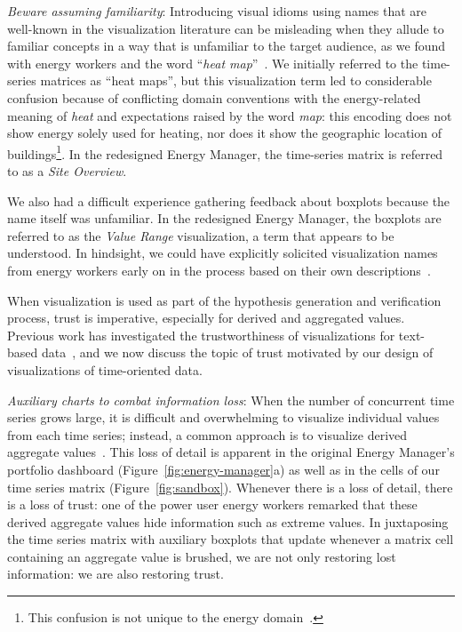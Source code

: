 \documentclass[journal]{vgtc}                %
\newcommand{\bstart}[1]{\vspace{1mm} \noindent{\textbf{#1:}}}
\newcommand{\jn}[1]{\textcolor{darkGreen}{#1}}
\begin{document}


{\it Beware assuming familiarity}: Introducing visual idioms using names that are well-known in the visualization literature can be misleading when they allude to familiar concepts in a way that is unfamiliar to the target audience, as we found with energy workers and the word ``{\it heat map}''~\cite{Field2015,Wilkinson2009}.
We initially referred to the time-series matrices as ``heat maps'', but this visualization term led to considerable confusion because of conflicting domain conventions with the energy-related meaning of {\it heat} and expectations raised by the word {\it map}: this encoding does not show energy solely used for heating, nor does it show the geographic location of buildings\footnote{This confusion is not unique to the energy domain~\cite{Field2015,Wilkinson2009}.}. 
In the redesigned Energy Manager, the time-series matrix is referred to as a {\it Site Overview}.

We also had a difficult experience gathering feedback about boxplots because the name itself was unfamiliar. 
In the redesigned Energy Manager, the boxplots are referred to as the {\it Value Range} visualization, a term that appears to be understood. %
In hindsight, we could have explicitly solicited visualization names from energy workers early on in the process based on their own descriptions~\cite{Metoyer2012}. 

\bstart{Trust} When visualization is used as part of the hypothesis generation and verification process, trust is imperative, especially for derived and aggregated values. %
Previous work has investigated the trustworthiness of visualizations for text-based data~\cite{Chuang2012}, and we now discuss the topic of trust motivated by our design of visualizations of time-oriented data.

{\it Auxiliary charts to combat information loss}: When the number of concurrent time series grows large, it is difficult and overwhelming to visualize individual values from each time series; instead, a common approach is to visualize derived aggregate values~\cite{McLachlan2008}.
This loss of detail is apparent in the original Energy Manager's portfolio dashboard (Figure~\ref{fig:energy-manager}a) as well as in the cells of our time series matrix (Figure~\ref{fig:sandbox}).
Whenever there is a loss of detail, there is a loss of trust: one of the power user energy workers remarked that these derived aggregate values hide information such as extreme values.
In juxtaposing the time series matrix with auxiliary boxplots that update whenever a matrix cell containing an aggregate value is brushed, we are not only restoring lost information: we are also restoring trust.
\end{document}
